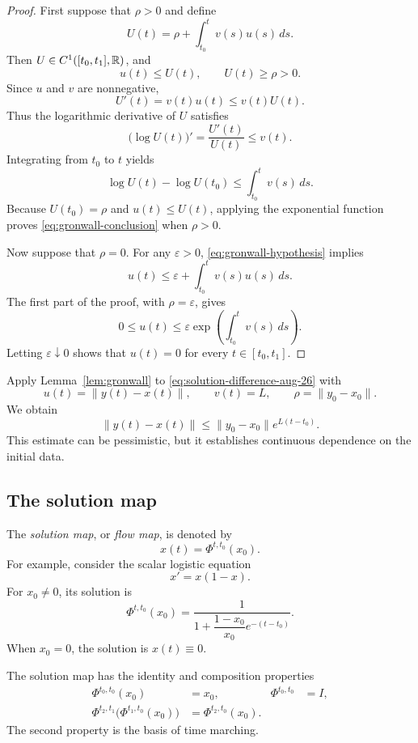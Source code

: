 \begin{proof}
  First suppose that $\rho>0$ and define
  \[
    U(t)=\rho+\int_{t_0}^t v(s)u(s)\,ds.
  \]
  Then $U\in C^1([t_0,t_1],\mathbb{R})$, and
  \[
    u(t)\leq U(t),
    \qquad
    U(t)\geq \rho>0.
  \]
  Since $u$ and $v$ are nonnegative,
  \[
    U'(t)=v(t)u(t)\leq v(t)U(t).
  \]
  Thus the logarithmic derivative of $U$ satisfies
  \[
    \bigl(\log U(t)\bigr)'=\frac{U'(t)}{U(t)}\leq v(t).
  \]
  Integrating from $t_0$ to $t$ yields
  \[
    \log U(t)-\log U(t_0)
    \leq \int_{t_0}^t v(s)\,ds.
  \]
  Because $U(t_0)=\rho$ and $u(t)\leq U(t)$, applying the exponential
  function proves \eqref{eq:gronwall-conclusion} when $\rho>0$.

  Now suppose that $\rho=0$. For any $\varepsilon>0$,
  \eqref{eq:gronwall-hypothesis} implies
  \[
    u(t)\leq \varepsilon+\int_{t_0}^t v(s)u(s)\,ds.
  \]
  The first part of the proof, with $\rho=\varepsilon$, gives
  \[
    0\leq u(t)
    \leq \varepsilon
    \exp\left(\int_{t_0}^t v(s)\,ds\right).
  \]
  Letting $\varepsilon\downarrow 0$ shows that $u(t)=0$ for every
  $t\in[t_0,t_1]$.
\end{proof}

Apply Lemma~\ref{lem:gronwall} to
\eqref{eq:solution-difference-aug-26} with
\[
  u(t)=\lVert y(t)-x(t)\rVert,
  \qquad
  v(t)=L,
  \qquad
  \rho=\lVert y_0-x_0\rVert.
\]
We obtain
\begin{equation}\label{eq:gronwall-stability-aug-26}
  \lVert y(t)-x(t)\rVert
  \leq \lVert y_0-x_0\rVert e^{L(t-t_0)}.
\end{equation}
This estimate can be pessimistic, but it establishes continuous
dependence on the initial data.

\subsection{The solution map}

The \emph{solution map}, or \emph{flow map}, is denoted by
\[
  x(t)=\Phi^{t,t_0}(x_0).
\]
For example, consider the scalar logistic equation
\[
  x'=x(1-x).
\]
For $x_0\neq 0$, its solution is
\[
  \Phi^{t,t_0}(x_0)
  =\frac{1}{1+\dfrac{1-x_0}{x_0}e^{-(t-t_0)}}.
\]
When $x_0=0$, the solution is $x(t)\equiv0$.

The solution map has the identity and composition properties
\begin{align*}
  \Phi^{t_0,t_0}(x_0)&=x_0,
  &\Phi^{t_0,t_0}&=I,\\
  \Phi^{t_2,t_1}\bigl(\Phi^{t_1,t_0}(x_0)\bigr)
    &=\Phi^{t_2,t_0}(x_0).
\end{align*}
The second property is the basis of time marching.

